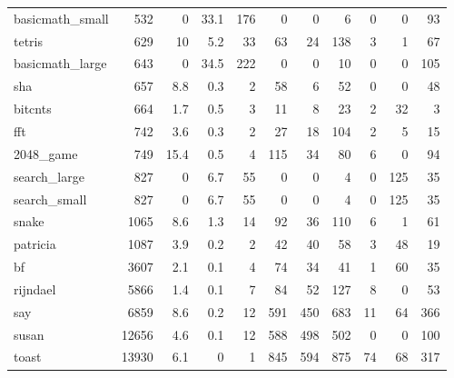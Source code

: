 \begin{tabular}{lrrrrrrrrrr}
 basicmath\_small &            532 &      0   &   33.1 &  176 &      0 &          0 &            6 &     0 &     0 &    93 \\
 tetris          &            629 &     10   &    5.2 &   33 &     63 &         24 &          138 &     3 &     1 &    67 \\
 basicmath\_large &            643 &      0   &   34.5 &  222 &      0 &          0 &           10 &     0 &     0 &   105 \\
 sha             &            657 &      8.8 &    0.3 &    2 &     58 &          6 &           52 &     0 &     0 &    48 \\
 bitcnts         &            664 &      1.7 &    0.5 &    3 &     11 &          8 &           23 &     2 &    32 &     3 \\
 fft             &            742 &      3.6 &    0.3 &    2 &     27 &         18 &          104 &     2 &     5 &    15 \\
 2048\_game       &            749 &     15.4 &    0.5 &    4 &    115 &         34 &           80 &     6 &     0 &    94 \\
 search\_large    &            827 &      0   &    6.7 &   55 &      0 &          0 &            4 &     0 &   125 &    35 \\
 search\_small    &            827 &      0   &    6.7 &   55 &      0 &          0 &            4 &     0 &   125 &    35 \\
 snake           &           1065 &      8.6 &    1.3 &   14 &     92 &         36 &          110 &     6 &     1 &    61 \\
 patricia        &           1087 &      3.9 &    0.2 &    2 &     42 &         40 &           58 &     3 &    48 &    19 \\
 bf              &           3607 &      2.1 &    0.1 &    4 &     74 &         34 &           41 &     1 &    60 &    35 \\
 rijndael        &           5866 &      1.4 &    0.1 &    7 &     84 &         52 &          127 &     8 &     0 &    53 \\
 say             &           6859 &      8.6 &    0.2 &   12 &    591 &        450 &          683 &    11 &    64 &   366 \\
 susan           &          12656 &      4.6 &    0.1 &   12 &    588 &        498 &          502 &     0 &     0 &   100 \\
 toast           &          13930 &      6.1 &    0   &    1 &    845 &        594 &          875 &    74 &    68 &   317 \\

\end{tabular}
